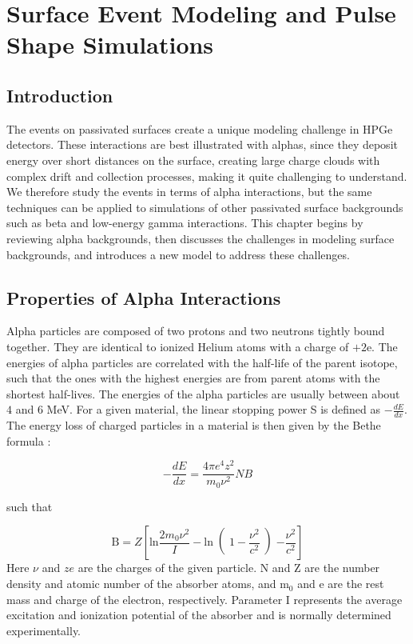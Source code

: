 \chapter{Surface Event Modeling and Pulse Shape Simulations}

\section{Introduction}
The events on passivated surfaces create a unique modeling challenge in HPGe detectors. These interactions are best illustrated with alphas, since they deposit energy over short distances on the surface, creating large charge clouds with complex drift and collection processes, making it quite challenging to understand. We therefore study the events in terms of alpha interactions, but the same techniques can be applied to simulations of other passivated surface backgrounds such as beta and low-energy gamma interactions. This chapter begins by reviewing alpha backgrounds, then discusses the challenges in modeling surface backgrounds, and introduces a new model to address these challenges.


\section{Properties of Alpha Interactions}
Alpha particles are composed of two protons and two neutrons tightly bound together. They are identical to ionized Helium atoms with a charge of $+2$e. The energies of alpha particles are correlated with the half-life of the parent isotope, such that the ones with the highest energies are from parent atoms with the shortest half-lives. The energies of the alpha particles are usually between about $4$ and $6$ MeV. For a given material, the linear stopping power S is defined as $-\frac{dE}{dx}$. The energy loss of charged particles in a material is then given by the Bethe formula \cite{Bethe1953}:

\begin{equation}\label{bethe_formula}
    -\frac{dE}{dx} = \frac{4\pi e^4z^2}{m_0\nu^2}NB
\end{equation}

\noindent
such that

\begin{equation}\label{bethe_B}
    \text{B}=Z\left[ \text{ln}\frac{2m_0\nu^2}{I}-\text{ln}\right(1-\frac{\nu^2}{c^2}\left)-\frac{\nu^2}{c^2}\right]
\end{equation}
\noindent
Here $\nu$ and $ze$ are the charges of the given particle. N and Z are the number density and atomic number of the absorber atoms, and m$_0$ and e are the rest mass and charge of the electron, respectively. Parameter I represents the average excitation and ionization potential of the absorber and is normally determined experimentally. 

